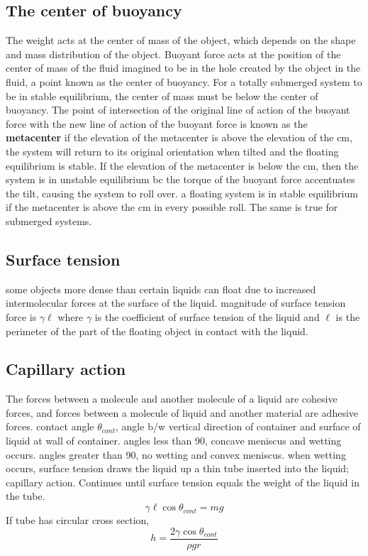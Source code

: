 \documentclass{article}
\begin{document}
\subsection{The center of buoyancy}
\begin{outline}
    \1 The weight acts at the center of mass of the object, which depends on the shape and mass distribution of the object. 
    \1 Buoyant force acts at the position of the center of mass of the fluid imagined to be in the hole created by the object in the fluid, a point known as the center of buoyancy. 
    \1 For a totally submerged system to be in stable equilibrium, the center of mass must be below the center of buoyancy.
    \1 The point of intersection of the original line of action of the buoyant force with the new line of action of the buoyant force is known as the \textbf{metacenter}
    \1 if the elevation of the metacenter is above the elevation of the cm, the system will return to its original orientation when tilted and the floating equilibrium is stable. If the elevation of the metacenter is below the cm, then the system is in unstable equilibrium bc the torque of the buoyant force accentuates the tilt, causing the system to roll over.
    \1 a floating system is in stable equilibrium if the metacenter is above the cm in every possible roll. The same is true for submerged systems. 
\end{outline}
\subsection{Surface tension}
\begin{outline}
    \1 some objects more dense than certain liquids can float due to increased intermolecular forces at the surface of the liquid. 
    \1 magnitude of surface tension force is \(\gamma\ell\) where $\gamma$ is the coefficient of surface tension of the liquid and $\ell$ is the perimeter of the part of the floating object in contact with the liquid. 
\end{outline}
\subsection{Capillary action}
\begin{outline}
    \1 The forces between a molecule and another molecule of a liquid are cohesive forces, and forces between a molecule of liquid and another material are adhesive forces. 
    \1 contact angle $\theta_{cont}$, angle b/w vertical direction of container and surface of liquid at wall of container. 
        \2 angles less than 90, concave meniscus and wetting occurs. 
        \2 angles greater than 90, no wetting and convex meniscus. 
    \1 when wetting occurs, surface tension draws the liquid up a thin tube inserted into the liquid; capillary action. Continues until surface tension equals the weight of the liquid in the tube. \[\gamma\ell\cos{\theta_{cont}}=mg\]
    \1 If tube has circular cross section, \[h=\dfrac{2\gamma\cos{\theta_{cont}}}{\rho gr}\]
\end{outline}
\end{document}

